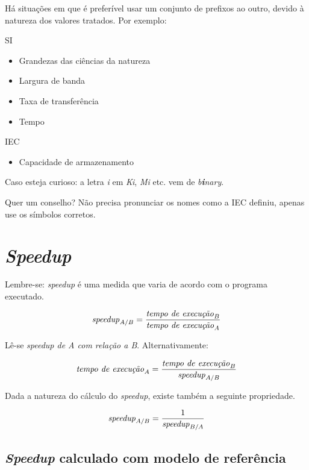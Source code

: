 \documentclass[12pt]{article}
\newcommand{\Text}[1]{\textrm{\textit{#1}}}
\begin{document}
Há situações em que é preferível usar um conjunto de prefixos ao outro, devido à natureza dos valores tratados. Por exemplo:

\begin{minipage}[t]{0.5\linewidth}
SI
\begin{itemize}
  \item Grandezas das ciências da natureza
  \item Largura de banda
  \item Taxa de transferência
  \item Tempo
\end{itemize}
\end{minipage}%
\begin{minipage}[t]{0.5\linewidth}
IEC
\begin{itemize}
  \item Capacidade de armazenamento
\end{itemize}
\end{minipage}

Caso esteja curioso: a letra \emph{i} em \emph{Ki}, \emph{Mi} etc. vem de \emph{b\textbf{i}nary}.

Quer um conselho? Não precisa pronunciar os nomes como a IEC definiu, apenas use os símbolos corretos.


\section{\textit{Speedup}}


Lembre-se: \textit{speedup} é uma medida que varia de acordo com o programa executado.

\begin{equation} \label{eq:speedup}
  \Text{speedup}_{A/B} =
  \frac{\Text{tempo de execução}_B}{\Text{tempo de execução}_A}
\end{equation}

Lê-se \emph{\textit{speedup de A com relação a B}}. Alternativamente:

\[
  \Text{tempo de execução}_A
  = \frac{\Text{tempo de execução}_B}{\Text{speedup}_{A/B}}
\]


Dada a natureza do cálculo do \textit{speedup}, existe também a seguinte propriedade.

\[ \Text{speedup}_{A/B} = \frac{1}{\Text{speedup}_{B/A}} \]


\subsection{\textit{Speedup} calculado com modelo de referência}
\end{document}

